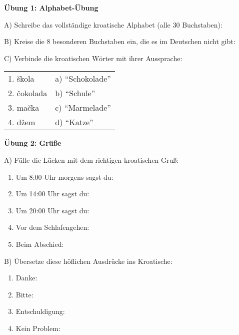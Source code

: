 \begin{exercise}
\textbf{Übung 1: Alphabet-Übung}

A) Schreibe das vollständige kroatische Alphabet (alle 30 Buchstaben):

\vspace{2cm}

B) Kreise die 8 besonderen Buchstaben ein, die es im Deutschen nicht gibt:

\vspace{1cm}

C) Verbinde die kroatischen Wörter mit ihrer Aussprache:

\begin{tabular}{ll}
1. škola & a) ``Schokolade'' \\
2. čokolada & b) ``Schule'' \\
3. mačka & c) ``Marmelade'' \\
4. džem & d) ``Katze'' \\
\end{tabular}

\vspace{2cm}

\textbf{Übung 2: Grüße}

A) Fülle die Lücken mit dem richtigen kroatischen Gruß:

\begin{enumerate}
    \item Um 8:00 Uhr morgens sagst du: \underline{\hspace{5cm}}
    \item Um 14:00 Uhr sagst du: \underline{\hspace{5cm}}
    \item Um 20:00 Uhr sagst du: \underline{\hspace{5cm}}
    \item Vor dem Schlafengehen: \underline{\hspace{5cm}}
    \item Beim Abschied: \underline{\hspace{5cm}}
\end{enumerate}

B) Übersetze diese höflichen Ausdrücke ins Kroatische:

\begin{enumerate}
    \item Danke: \underline{\hspace{5cm}}
    \item Bitte: \underline{\hspace{5cm}}
    \item Entschuldigung: \underline{\hspace{5cm}}
    \item Kein Problem: \underline{\hspace{5cm}}
\end{enumerate}


\end{exercise}

